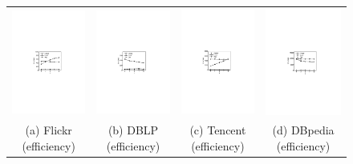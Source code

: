 \begin{figure}[htp]
\hspace*{-.4cm}
\centering
\begin{tabular}{c c c c}
      \begin{minipage}{3.725cm}
	\includegraphics[width=3.725cm]{figures/flickr-comp}
  \end{minipage}
  &
  \begin{minipage}{3.725cm}
	\includegraphics[width=3.725cm]{figures/dblp-comp}
  \end{minipage}
  &
  \begin{minipage}{3.725cm}
	\includegraphics[width=3.725cm]{figures/tencent-comp}
  \end{minipage}
  &
  \begin{minipage}{3.725cm}
	\includegraphics[width=3.725cm]{figures/dbpedia-comp}
  \end{minipage}
  \\
  \small (a) Flickr (efficiency)
  &
  \small (b) DBLP (efficiency)
  &
  \small (c) Tencent (efficiency)
  &
  \small (d) DBpedia (efficiency)
  \\


\end{tabular}
\end{figure}
